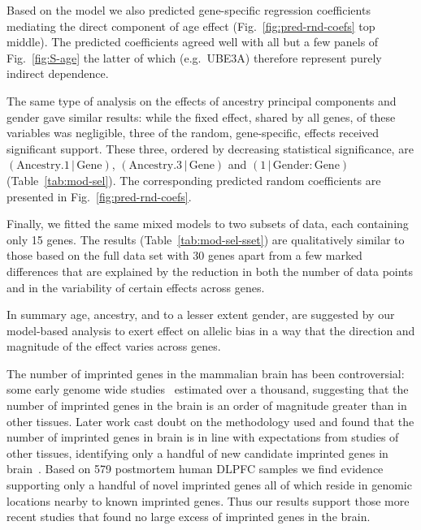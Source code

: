 \documentclass[letterpaper]{article}
\begin{document}
Based on the model we also predicted
gene-specific regression coefficients mediating the direct component of age
effect (Fig.~\ref{fig:pred-rnd-coefs} top middle).  The predicted coefficients
agreed well with all but a few panels of Fig.~\ref{fig:S-age} the latter of
which (e.g.~UBE3A) therefore represent purely indirect dependence.

The same type of analysis on the effects of ancestry principal components and
gender gave similar results: while the fixed effect, shared by all genes, of
these variables was negligible, three of the random, gene-specific, effects
received significant support.  These three, ordered by decreasing
statistical significance, are
\((\mathrm{Ancestry.1}\,|\,\mathrm{Gene})\),
\((\mathrm{Ancestry.3}\,|\,\mathrm{Gene})\) and
\((1\,|\,\mathrm{Gender}:\mathrm{Gene})\) (Table~\ref{tab:mod-sel}).  The
corresponding predicted random coefficients are presented in
Fig.~\ref{fig:pred-rnd-coefs}.

Finally, we fitted the same mixed models to two subsets of data, each
containing only 15 genes.  The results (Table~\ref{tab:mod-sel-sset}) are
qualitatively similar to those based on the full data set with 30 genes apart
from a few marked differences that are explained by the reduction in both the
number of data points and in the variability of certain effects across genes.

In summary age, ancestry, and to a lesser extent gender, are suggested by our
model-based analysis to exert effect on allelic bias in a way that the
direction and magnitude of the effect varies across genes.

The number of imprinted genes in the mammalian brain has been controversial:
some early genome wide studies~\cite{Gregg2010a,Gregg2010} estimated over a
thousand, suggesting that the number of imprinted genes in the brain is an
order of magnitude greater than in other tissues.  Later work cast doubt on
the methodology used and found that the number of imprinted genes in brain is
in line with expectations from studies of other tissues, identifying only a
handful of new candidate imprinted genes in brain~\cite{Baran2015,DeVeale2012,Perez2015}.
Based on 579 postmortem human DLPFC
samples we find evidence supporting only a handful of novel imprinted genes
all of which reside in genomic locations nearby to known imprinted genes.
Thus our results support those more recent studies that found no large excess
of imprinted genes in the brain.
\end{document}
